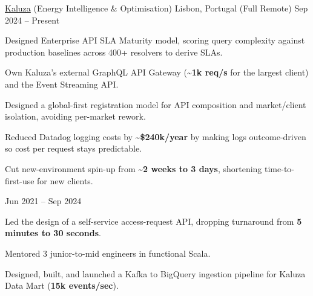 
\begin{cventries}
    {\href{https://www.kaluza.com/}{Kaluza} (Energy Intelligence \& Optimisation)}
    {Lisbon, Portugal (Full Remote)}
    {Sep 2024 – Present}
    {
    \begin{cvitems}
      \item Designed Enterprise API SLA Maturity model, scoring query complexity against production baselines across 400+ resolvers to derive SLAs.
      \item Own Kaluza's external GraphQL API Gateway (\textbf{\textasciitilde{}1k req/s} for the largest client) and the Event Streaming API.
      \item Designed a global-first registration model for API composition and market/client isolation, avoiding per-market rework.
      \item Reduced Datadog logging costs by \textbf{\textasciitilde{}\$240k/year} by making logs outcome-driven so cost per request stays predictable.
      \item Cut new-environment spin-up from \textbf{\textasciitilde{}2 weeks to 3 days}, shortening time-to-first-use for new clients.
    \end{cvitems}
  }
    {}
    {}
    {Jun 2021 – Sep 2024}
    {
    \begin{cvitems}
      \item Led the design of a self-service access-request API, dropping turnaround from \textbf{5 minutes to 30 seconds}.
      \item Mentored 3 junior-to-mid engineers in functional Scala.
      \item Designed, built, and launched a Kafka to BigQuery ingestion pipeline for Kaluza Data Mart (\textbf{15k events/sec}).

\end{cvitems}}
\end{cventries}
